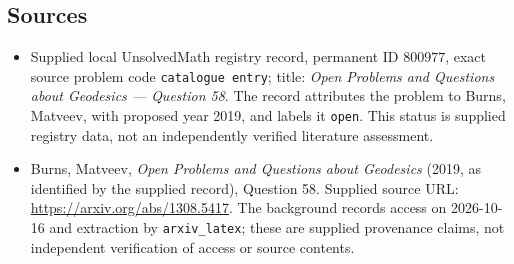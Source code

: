 \documentclass[11pt]{article}
\begin{document}
\subsection{Sources}
\begin{itemize}
\item Supplied local UnsolvedMath registry record, permanent ID \(800977\), exact source problem code \texttt{catalogue entry}; title: \emph{Open Problems and Questions about Geodesics --- Question 58}. The record attributes the problem to Burns, Matveev, with proposed year 2019, and labels it \texttt{open}. This status is supplied registry data, not an independently verified literature assessment.
\item Burns, Matveev, \emph{Open Problems and Questions about Geodesics} (2019, as identified by the supplied record), Question 58. Supplied source URL: \url{https://arxiv.org/abs/1308.5417}. The background records access on 2026-10-16 and extraction by \texttt{arxiv\_latex}; these are supplied provenance claims, not independent verification of access or source contents.
\end{itemize}
\end{document}
